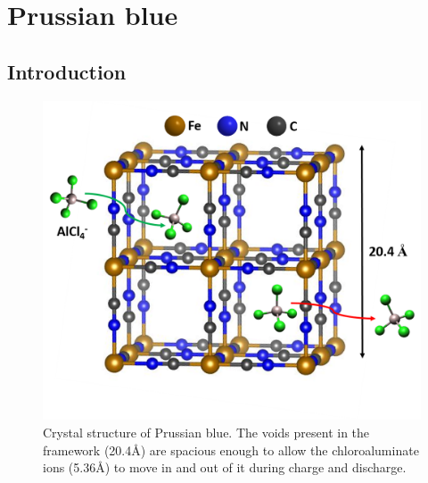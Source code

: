 \section{Prussian blue}

\subsection{Introduction}

 \begin{figure}[th!]
  \centering
  \includegraphics[width=\textwidth]{Figures/chap6fig/pbcrys}
    \caption{Crystal structure of Prussian blue. The voids present in the framework (20.4\AA) are spacious enough to allow the chloroaluminate ions (5.36\AA) to move in and out of it during charge and discharge. }
  \label{Figures/chap6fig:pbcrys}
\end{figure}

